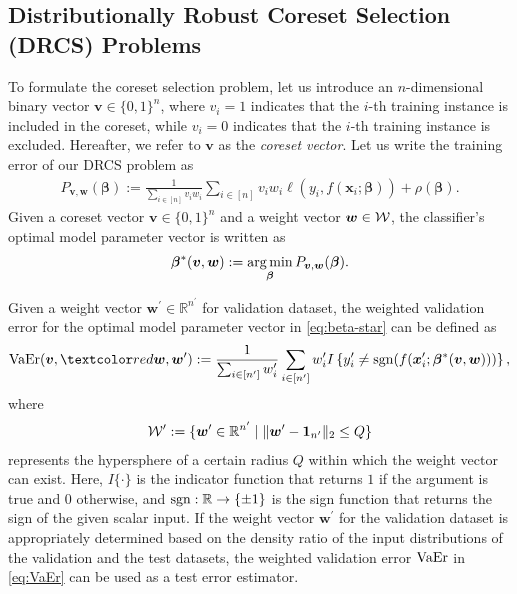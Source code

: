 
\subsection{Distributionally Robust Coreset Selection (DRCS) Problems}
%
To formulate the coreset selection problem, let us introduce an $ n $-dimensional binary vector $ \bm v \in \{0, 1\}^n $, where $ v_i = 1 $ indicates that the $ i $-th training instance is included in the coreset, while $ v_i = 0 $ indicates that the $ i $-th training instance is excluded.  
%
Hereafter, we refer to $ \bm v $ as the \emph{coreset vector}.  
%
Let us write the training error of our DRCS problem as
\begin{align}
\label{eq:primal}
P_{\bm v, \bm w}(\bm \beta)
:=
\frac{1}{\sum_{i \in [n]} v_i w_i}
\sum_{i \in [n]}
v_i
w_i
\ell
\left(
y_i, f(\bm x_i; \bm \beta)
\right)
+
\rho(\bm \beta). 
\end{align}
%
Given a coreset vector $\bm v \in \{0, 1\}^n$ and a weight vector $\bm w \in {\mathcal W}$, the classifier's optimal model parameter vector is written as
\begin{align}
 \label{eq:beta-star}
 \bm \beta^*(\bm v, \bm w)
 :=
 \operatorname*{arg\,min}_{\bm \beta}
 P_{\bm v, \bm w}(\bm \beta).
\end{align}

Given a weight vector $\bm{w}^\prime \in \mathbb{R}^{n^\prime}$ for validation dataset, the weighted validation error for the optimal model parameter vector in \eqref{eq:beta-star} can be defined as  
\begin{align}
\label{eq:VaEr}
{\rm VaEr}(\bm{v}, \red{\bm{w}, \bm{w}^\prime}) 
:= 
\frac{1}{\sum_{i \in [n^\prime]} w_i^\prime} 
\sum_{i \in [n^\prime]} 
w_i^\prime 
I 
\left\{ 
y_i^\prime \neq {\rm sgn}(f(\bm{x}_i^\prime; \bm{\beta}^*(\bm{v}, \bm{w}))) 
\right\},
\end{align}
where  
\begin{align}  
{\mathcal W}^\prime := \{\bm{w}^\prime \in \mathbb{R}^{n^\prime} \mid \| \bm{w}^\prime - \bm{1}_{n^\prime} \|_2 \le Q\}  
\end{align}  
represents the hypersphere of a certain radius $Q$ within which the weight vector can exist.
%
Here, $I\{\cdot\}$ is the indicator function that returns $1$ if the argument is true and $0$ otherwise, and ${\rm sgn}: \mathbb{R} \to \{\pm 1\}$ is the sign function that returns the sign of the given scalar input. 
%
If the weight vector $\bm w^\prime$ for the validation dataset is appropriately determined based on the density ratio of the input distributions of the validation and the test datasets, the weighted validation error ${\rm VaEr}$ in \eqref{eq:VaEr} can be used as a test error estimator.

